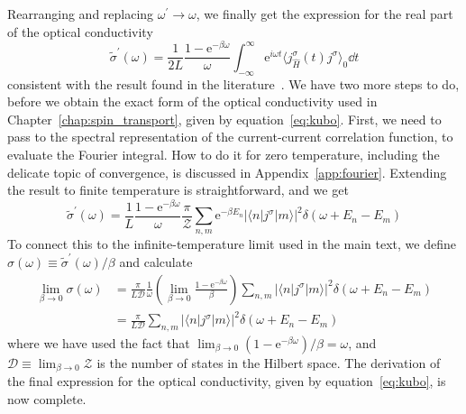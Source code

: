 Rearranging and replacing \(\omega^{\prime} \to \omega \), we finally get the expression for the real part of the
optical conductivity
\begin{equation}
    \tilde{\sigma}^{\prime}(\omega ) = \frac{1}{2L} \frac{1-\mathrm{e}^{-\beta \omega }}{\omega } \int_{-\infty}^{\infty}   \mathrm{e}^{i \omega t} \langle j^{\sigma }_{\hat{H} }(t) j^{\sigma } \rangle_0 \dd{t} 
\end{equation}
consistent with the result found in the literature~\autocite{Mahan2000,Gohmann2022,Sirker2020}. We have two more steps
to do, before we obtain the exact form of the optical conductivity used in Chapter~\ref{chap:spin_transport}, given by
equation~\eqref{eq:kubo}. First, we need to pass to the spectral representation of the current-current correlation function,
to evaluate the Fourier integral. How to do it for zero temperature, including the delicate topic of convergence, is discussed
in Appendix~\ref{app:fourier}. Extending the result to finite temperature is straightforward, and we get
\begin{equation}
    \tilde{\sigma}^{\prime}(\omega ) = \frac{1}{L} \frac{1-\mathrm{e}^{-\beta \omega }}{\omega } \frac{\pi }{\mathcal{Z} }
    \sum_{n,m} \mathrm{e}^{-\beta E_n} \left| \langle n | j^{\sigma } | m \rangle \right|^2 \delta (\omega  + E_n - E_m)
\end{equation}
To connect this to the infinite-temperature limit used in the main text, we define
\(\sigma (\omega )\equiv \tilde{\sigma }^{\prime} (\omega )/\beta \) and calculate
\begin{align}
    \lim_{\beta  \to 0} \sigma(\omega ) & = \frac{\pi}{L \mathcal{D} } \frac{1}{\omega }\left( \lim_{\beta  \to 0} \frac{1-\mathrm{e}^{-\beta \omega } }{\beta } \right)
    \sum _{n,m} \left| \langle n | j^{\sigma } | m \rangle \right|^2 \delta (\omega  + E_n - E_m) \nonumber                                                              \\
                                        & = \frac{\pi}{L \mathcal{D} } \sum _{n,m} \left| \langle n | j^{\sigma } | m \rangle \right|^2 \delta (\omega  + E_n - E_m)
\end{align}
where we have used the fact that \(\lim_{\beta  \to 0} (1-\mathrm{e}^{-\beta \omega })/\beta = \omega \), and
\(\mathcal{D} \equiv \lim_{\beta  \to 0} \mathcal{Z} \) is the number of states in the Hilbert space.
The derivation of the final expression for the optical conductivity, given by equation~\eqref{eq:kubo}, is now complete.